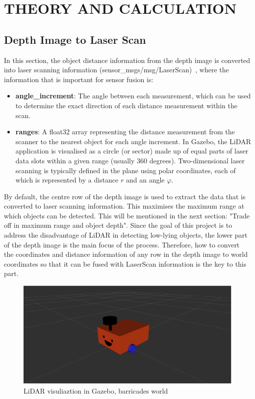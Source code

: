 \section{THEORY AND CALCULATION}
\label{sec:theory_and_calculation}
\subsection{Depth Image to Laser Scan}
In this section, the object distance information from the depth image is converted into laser scanning information (sensor\_msgs/msg/LaserScan)~\cite{laserscan}, 
where the information that is important for sensor fusion is:
\begin{itemize}[leftmargin=*]
    \item \textbf{angle\_increment}: The angle between each measurement, 
    which can be used to determine the exact direction of each distance measurement within the scan. 
    \item \textbf{ranges}: A float32 array representing the distance measurement from the scanner to the nearest object for each angle increment. 
    In Gazebo, the LiDAR application is visualised as a circle (or sector) made up of equal parts of laser data slots within a given range (usually $360$ degrees). 
    Two-dimensional laser scanning is typically defined in the plane using polar coordinates, each of which is represented by a distance $r$ and an angle $\varphi$.
\end{itemize}
By default, the centre row of the depth image is used to extract the data that is converted to laser scanning information. 
This maximises the maximum range at which objects can be detected. 
This will be mentioned in the next section: "Trade off in maximum range and object depth". 
Since the goal of this project is to address the disadvantage of LiDAR in detecting low-lying objects, 
the lower part of the depth image is the main focus of the process. 
Therefore, how to convert the coordinates and distance information of any row in the depth image to world coordinates 
so that it can be fused with LaserScan information is the key to this part.

\begin{figure}[H]
    \centering
    \includegraphics[width=0.8\linewidth]{figs/robot.png}
    \caption{LiDAR visuliaztion in Gazebo, barricades world}
\end{figure}

